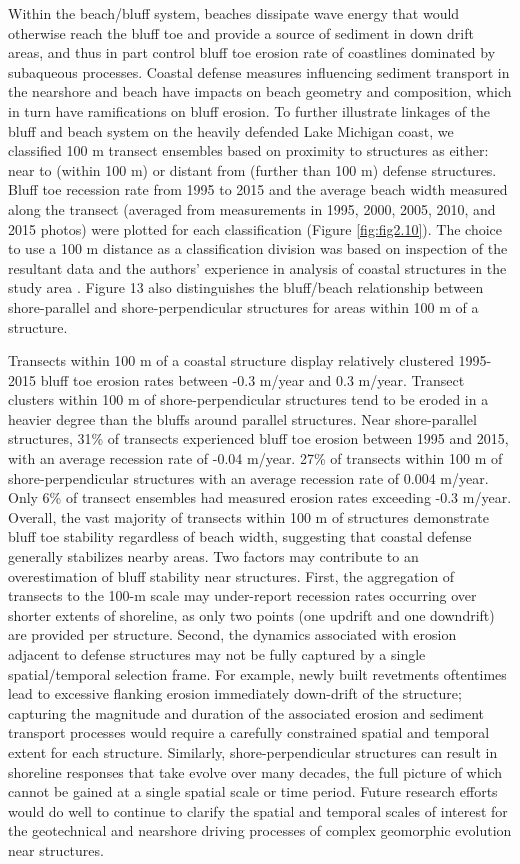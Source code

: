 Within the beach/bluff system, beaches dissipate wave energy that would
otherwise reach the bluff toe and provide a source of sediment in down drift
areas, and thus in part control bluff toe erosion rate of coastlines dominated
by subaqueous processes. Coastal defense measures influencing sediment transport
in the nearshore and beach have impacts on beach geometry and composition, which
in turn have ramifications on bluff erosion. To further illustrate linkages of
the bluff and beach system on the heavily defended Lake Michigan coast, we
classified 100 m transect ensembles based on proximity to structures as either:
near to (within 100 m) or distant from (further than 100 m) defense structures.
Bluff toe recession rate from 1995 to 2015 and the average beach width measured
along the transect (averaged from measurements in 1995, 2000, 2005, 2010, and
2015 photos) were plotted for each classification (Figure \ref{fig:fig2.10}).
The choice to use a 100 m distance as a classification division was based on
inspection of the resultant data and the authors’ experience in analysis of
coastal structures in the study area \citep{lin_field_2014}. Figure 13 also
distinguishes the bluff/beach relationship between shore-parallel and
shore-perpendicular structures for areas within 100 m of a structure. 

Transects within 100 m of a coastal structure display relatively clustered
1995-2015 bluff toe erosion rates between -0.3 m/year and 0.3 m/year. Transect
clusters within 100 m of shore-perpendicular structures tend to be eroded in a
heavier degree than the bluffs around parallel structures. Near shore-parallel
structures, 31\% of transects experienced bluff toe erosion between 1995 and
2015, with an average recession rate of -0.04 m/year. 27\% of transects within
100 m of shore-perpendicular structures with an average recession rate of 0.004
m/year.  Only 6\% of transect ensembles had measured erosion rates exceeding
-0.3 m/year. Overall, the vast majority of transects within 100 m of structures
demonstrate bluff toe stability regardless of beach width, suggesting that
coastal defense generally stabilizes nearby areas. Two factors may contribute to
an overestimation of bluff stability near structures. First, the aggregation of
transects to the 100-m scale may under-report recession rates occurring over
shorter extents of shoreline, as only two points (one updrift and one downdrift)
are provided per structure. Second, the dynamics associated with erosion
adjacent to defense structures may not be fully captured by a single
spatial/temporal selection frame. For example, newly built revetments oftentimes
lead to excessive flanking erosion immediately down-drift of the structure;
capturing the magnitude and duration of the associated erosion and sediment
transport processes would require a carefully constrained spatial and temporal
extent for each structure. Similarly, shore-perpendicular structures can result
in shoreline responses that take evolve over many decades, the full picture of
which cannot be gained at a single spatial scale or time period.  Future
research efforts would do well to continue to clarify the spatial and temporal
scales of interest for the geotechnical and nearshore driving processes of
complex geomorphic evolution near structures.

